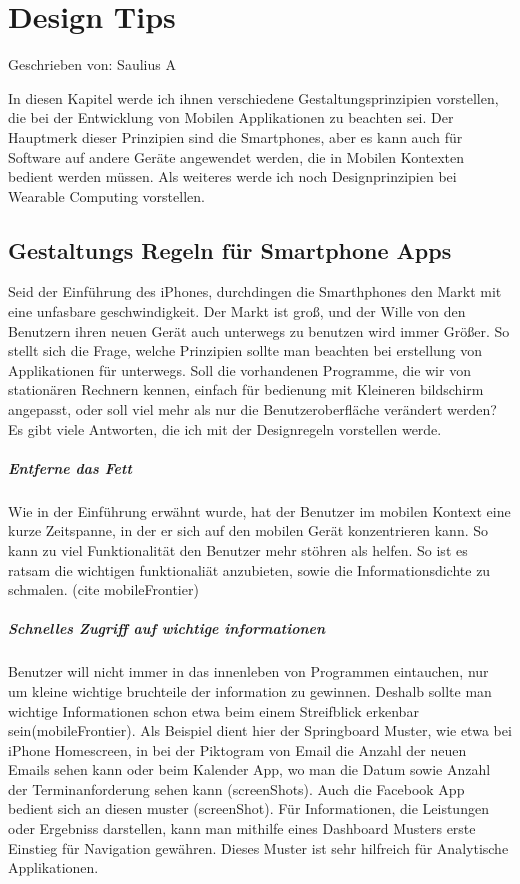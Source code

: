 
\section{Design Tips}

Geschrieben von: Saulius A

In diesen Kapitel werde ich ihnen verschiedene Gestaltungsprinzipien vorstellen, die bei der Entwicklung von Mobilen Applikationen zu beachten sei. Der Hauptmerk dieser Prinzipien sind die Smartphones, aber es kann auch für Software auf andere Geräte angewendet werden, die in Mobilen Kontexten bedient werden müssen. Als weiteres werde ich noch Designprinzipien bei Wearable Computing vorstellen. 

\subsection{Gestaltungs Regeln für Smartphone Apps} %
\label{sub:design_f_r_mobile_ger_te}

Seid der Einführung des iPhones, durchdingen die Smarthphones den Markt mit eine unfasbare geschwindigkeit. Der Markt ist groß, und der Wille von den Benutzern ihren neuen Gerät auch unterwegs zu benutzen wird immer Größer. So stellt sich die Frage, welche Prinzipien sollte man beachten bei erstellung von Applikationen für unterwegs. Soll die vorhandenen Programme, die wir von stationären Rechnern kennen, einfach für bedienung mit Kleineren bildschirm angepasst, oder soll viel mehr als nur die Benutzeroberfläche verändert werden? Es gibt viele Antworten, die ich mit der Designregeln vorstellen werde.

\subparagraph{Entferne das Fett} %
\label{subp:entferne_das_fett}

Wie in der Einführung erwähnt wurde, hat der Benutzer im mobilen Kontext eine kurze Zeitspanne, in der er sich auf den mobilen Gerät konzentrieren kann. So kann zu viel Funktionalität den Benutzer mehr stöhren als helfen. So ist es ratsam die wichtigen funktionaliät anzubieten, sowie die Informationsdichte zu schmalen. (cite mobileFrontier)


\subparagraph{Schnelles Zugriff auf wichtige informationen} %
\label{subp:subparagraph_name}

Benutzer will nicht immer in das innenleben von Programmen eintauchen, nur um kleine wichtige bruchteile der information zu gewinnen. Deshalb sollte man wichtige Informationen schon etwa beim einem Streifblick erkenbar sein(mobileFrontier)\cite{Neil:2012uf}. Als Beispiel dient hier der Springboard Muster, wie etwa bei iPhone Homescreen, in bei der Piktogram von Email die Anzahl der neuen Emails sehen kann oder beim Kalender App, wo man die Datum sowie Anzahl der Terminanforderung sehen kann (screenShots). Auch die Facebook App bedient sich an diesen muster (screenShot). Für Informationen, die Leistungen oder Ergebniss darstellen, kann man mithilfe eines Dashboard Musters erste Einstieg für Navigation gewähren. Dieses Muster ist sehr hilfreich für Analytische Applikationen.

